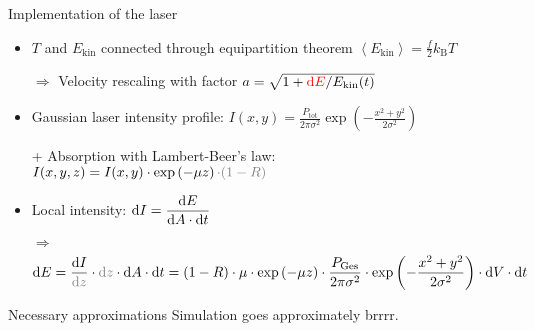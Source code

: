 \begin{frame}{Implementation of the laser}
	\begin{itemize}[<+->]
		\item $T$ and $E_\text{kin}$ connected through equipartition theorem
		$\left\langle E_\text{kin} \right\rangle = \frac{f}{2} k_\text{B} T$
		\item[$\Rightarrow$] Velocity rescaling with factor
		$a = \sqrt{1+  {\color{red} \dx[E]} / E_\text{kin}(t)}$
		\item Gaussian laser intensity profile: $I(x,y) = \frac{P_\text{tot}}{2\pi \sigma^2} \exp\left( -\frac{x^2+y^2}{2\sigma^2} \right)$
		\item[] + Absorption with Lambert-Beer's law: $I(x,y,z) = I(x,y) \cdot \exp\left(-\mu z\right) {\color{gray} \cdot (1-R)}$
		\vspace{0.5cm}
		\item Local intensity: $\dx[I] = \dfrac{\dx[E]}{\dx[A] \cdot \dx[t]}$
		\item[$\Rightarrow$]
		\begin{align}
			\dx[E] = \frac{\dx[I]}{\color{gray} \dx[z]} \cdot {\color{gray} \dx[z]} \cdot \dx[A] \cdot \dx[t]
				= (1-R) \cdot \mu \cdot \exp\left(-\mu z\right)
				\cdot \frac{P_\text{Ges}}{2\pi \sigma^2}
				\cdot \exp\left(-\frac{x^2 + y^2}{2\sigma^2}\right)
				\cdot \dx[V] \cdot \dt
		\end{align}
	\end{itemize}
\end{frame}


\begin{frame}{Necessary approximations}
	\missing Simulation goes approximately brrrr.
\end{frame}
